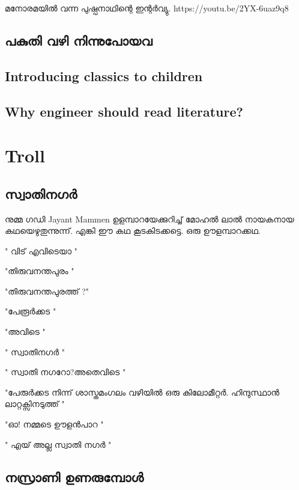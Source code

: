 \documentclass[10pt,a4paper]{report}
\begin{document}
    മനോരമയിൽ വന്ന പുഷ്പനാഥിന്റെ ഇന്റർവ്യു. https://youtu.be/2YX-6uaz9q8
    
\section{ പകുതി വഴി നിന്നുപോയവ }
        \section{Introducing classics to children}
        \section{Why engineer should read literature?}
\chapter{Troll}

\section{സ്വാതിനഗർ}
നുമ്മ ഗഡി Jayant Mammen ഉളമ്പാറയേക്കുറിച്ച് മാേഹൽ ലാൽ നായകനായ കഥയെഴുതുന്നുന്ന്. എങ്കി ഈ കഥ കൂടകിടക്കട്ടെ. ഒരു ഊളമ്പാറക്കഥ. 

" വിട് എവിടെയാ "

 "തിരുവനന്തപുരം " 
 
 "തിരുവനന്തപുരത്ത് ?"
 
  "പേരൂർക്കട " 
  
  "അവിടെ "
  
   " സ്വാതിനഗർ " 
   
   " സ്വാതി നഗറോ?അതെവിടെ " 
   
   "പേരുർക്കട നിന്ന് ശാസ്തമംഗലം വഴിയിൽ ഒരു കിലോമീറ്റർ. ഹിന്ദുസ്ഥാൻ ലാറ്റക്സിനടുത്ത് "
   
    "ഓ! നമ്മടെ ഊളൻപാറ " 
    
    " എയ് അല്ല സ്വാതി നഗർ "
\section{നസ്രാണി ഉണരുമ്പോൾ}
\end{document}
